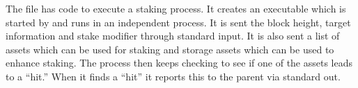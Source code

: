 The file {} has code to execute a staking process.
It creates an executable {}
which is started by {}
and runs in an independent process. It is sent the block height, target information
and stake modifier through standard input. It is also sent a list of assets
which can be used for staking
and storage assets which can be used to enhance staking.
The process then keeps checking to see if one of the
assets leads to a ``hit.'' When it finds a ``hit'' it reports this to
the parent via standard out.
